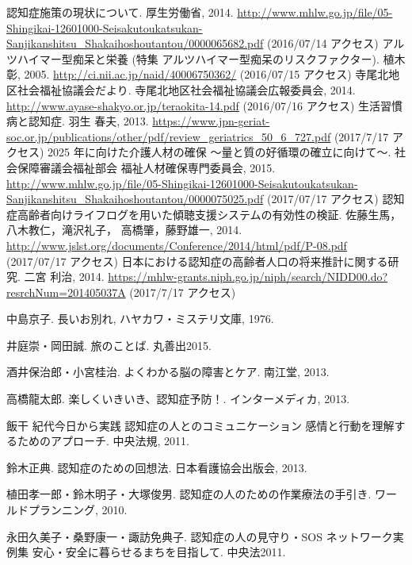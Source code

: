 \documentclass[openany,11pt,papersize]{jsbook}
\begin{document}

\begin{thebibliography}{9}
     認知症施策の現状について. 厚生労働省, 2014. \url{http://www.mhlw.go.jp/file/05-Shingikai-12601000-Seisakutoukatsukan-Sanjikanshitsu_Shakaihoshoutantou/0000065682.pdf} (2016/07/14 アクセス)
     アルツハイマー型痴呆と栄養 (特集 アルツハイマー型痴呆のリスクファクター). 植木 彰, 2005. \url{http://ci.nii.ac.jp/naid/40006750362/} (2016/07/15 アクセス)
     寺尾北地区社会福祉協議会だより. 寺尾北地区社会福祉協議会広報委員会, 2014. \url{http://www.ayase-shakyo.or.jp/teraokita-14.pdf} (2016/07/16 アクセス)
     生活習慣病と認知症. 羽生 春夫, 2013. \url{https://www.jpn-geriat-soc.or.jp/publications/other/pdf/review_geriatrics_50_6_727.pdf} (2017/7/17 アクセス)
     2025 年に向けた介護人材の確保 ～量と質の好循環の確立に向けて～. 社会保障審議会福祉部会  福祉人材確保専門委員会, 2015. \url{http://www.mhlw.go.jp/file/05-Shingikai-12601000-Seisakutoukatsukan-Sanjikanshitsu_Shakaihoshoutantou/0000075025.pdf} (2017/07/17 アクセス)
     認知症高齢者向けライフログを用いた傾聴支援システムの有効性の検証. 佐藤生馬，八木教仁，滝沢礼子， 高橋肇，藤野雄一, 2014. \url{http://www.jslst.org/documents/Conference/2014/html/pdf/P-08.pdf} (2017/07/17 アクセス)
     日本における認知症の高齢者人口の将来推計に関する研究. 二宮 利治, 2014. \url{https://mhlw-grants.niph.go.jp/niph/search/NIDD00.do?resrchNum=201405037A} (2017/7/17 アクセス)
    \item[]
    \item[] 中島京子. 長いお別れ, ハヤカワ・ミステリ文庫, 1976.
    \item[] 井庭崇・岡田誠. 旅のことば. 丸善出2015.
    \item[] 酒井保治郎・小宮桂治. よくわかる脳の障害とケア. 南江堂, 2013.
    \item[] 高橋龍太郎. 楽しくいきいき、認知症予防！. インターメディカ, 2013.
    \item[] 飯干 紀代今日から実践 認知症の人とのコミュニケーション 感情と行動を理解するためのアプローチ. 中央法規, 2011.
    \item[] 鈴木正典. 認知症のための回想法. 日本看護協会出版会, 2013.
    \item[] 植田孝一郎・鈴木明子・大塚俊男. 認知症の人のための作業療法の手引き. ワールドプランニング, 2010.
    \item[] 永田久美子・桑野康一・諏訪免典子. 認知症の人の見守り・SOS ネットワーク実例集 安心・安全に暮らせるまちを目指して. 中央法2011.
\end{thebibliography}
\end{document}
